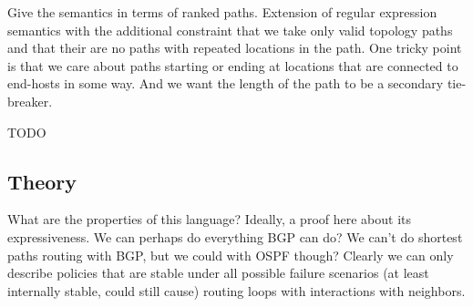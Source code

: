 Give the semantics in terms of ranked paths.
Extension of regular expression semantics with the
additional constraint that we take only valid topology paths and that their are no paths with
repeated locations in the path. One tricky point is that we care about paths starting or ending at locations that are
connected to end-hosts in some way. And we want the length of the path to be a secondary tie-breaker.


TODO



\subsection{Theory}
What are the properties of this language? Ideally, a proof here about its expressiveness. We can perhaps do everything
BGP can do? We can't do shortest paths routing with BGP, but we could with OSPF though? Clearly we can only describe
policies that are stable under all possible failure scenarios (at least internally stable, could still cause) routing
loops with interactions with neighbors.











